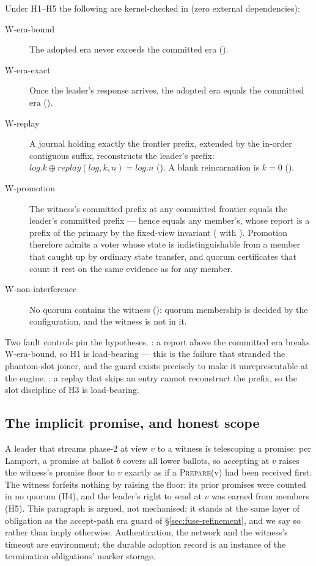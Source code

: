 Under H1--H5 the following are kernel-checked in 
(zero external dependencies):
\begin{description}
\item[W-era-bound] The adopted era never exceeds the committed era
  ().
\item[W-era-exact] Once the leader's response arrives, the adopted era
  equals the committed era ().
\item[W-replay] A journal holding exactly the frontier prefix, extended by
  the in-order contiguous suffix, reconstructs the leader's prefix:
  $\mathit{log}.k \oplus \mathit{replay}(\mathit{log},k,n) =
  \mathit{log}.n$ (). A blank reincarnation is
  $k=0$ ().
\item[W-promotion] The witness's committed prefix at any committed frontier
  equals the leader's committed prefix --- hence equals any member's, whose
  report is a prefix of the primary by the fixed-view invariant
  ( with
  ). Promotion therefore admits a voter
  whose state is indistinguishable from a member that caught up by
  ordinary state transfer, and quorum certificates that count it rest on
  the same evidence as for any member.
\item[W-non-interference] No quorum contains the witness
  (): quorum membership is decided by the
  configuration, and the witness is not in it.
\end{description}
Two fault controls pin the hypotheses. :
a report above the committed era breaks W-era-bound, so H1 is load-bearing
--- this is the failure that stranded the phantom-slot joiner, and the
guard exists precisely to make it unrepresentable at the engine.
: a replay that skips an entry cannot
reconstruct the prefix, so the slot discipline of H3 is load-bearing.

\subsection{The implicit promise, and honest scope}
A leader that streams phase-2 at view $v$ to a witness is telescoping a
promise: per Lamport, a promise at ballot $b$ covers all lower ballots, so
accepting at $v$ raises the witness's promise floor to $v$ exactly as if a
\textsc{Prepare}(v) had been received first. The witness forfeits nothing
by raising the floor: its prior promises were counted in no quorum (H4),
and the leader's right to send at $v$ was earned from members (H5). This
paragraph is argued, not mechanised; it stands at the same layer of
obligation as the accept-path era guard of \S\ref{sec:fuse-refinement},
and we say so rather than imply otherwise. Authentication, the network and
the witness's timeout are environment; the durable adoption record is an
instance of the termination obligations' marker storage.

